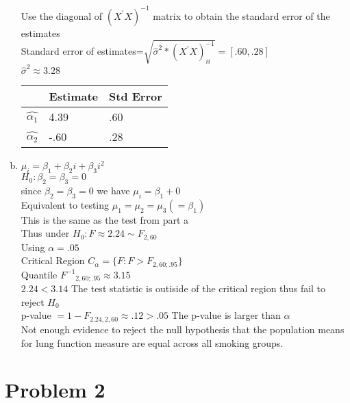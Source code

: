 \documentclass{article}
\begin{document}
\begin{flushleft}
\begin{enumerate}[(a)]
Use the diagonal of $(X^{'}X)^{-1}$ matrix to obtain the standard error of the estimates\\

Standard error of estimates=$\sqrt{\hat{\sigma}^2*(X^{'}X)^{-1}_{ii}}=[.60,.28]$\\

$\hat{\sigma}^2\approx 3.28$\\

\begin{tabular}{l l l}
	\hline
	& Estimate & Std Error\\
	\hline
	$\hat{\alpha_1}$ & 4.39 & .60 \\
	$\hat{\alpha_2}$ & -.60 & .28 \\
	\hline
\end{tabular}

\item
$\mu_i=\beta_1+\beta_2i+\beta_3i^2$\\

$H_0:\beta_2=\beta_3=0$\\

since $\beta_2=\beta_3=0$ we have $\mu_i=\beta_1+ 0$\\

Equivalent to testing $\mu_1=\mu_2=\mu_3 (=\beta_1)$\\

This is the same as the test from part a\\

Thus under $H_0: F \approx 2.24\sim F_{2,60}$\\

Using $\alpha=.05$\\

Critical Region $C_{\alpha}=\{F:F>F_{2,60;.95}\}$\\

Quantile ${F^{-1}}_{2,60;.95} \approx 3.15$\\

$2.24<3.14$ The test statistic is outiside of the critical region thus fail to reject $H_0$\\

p-value $= 1-F_{2.24,2,60}\approx .12>.05$ The p-value is larger than $\alpha$\\

Not enough evidence to reject the null hypothesis that the population means for lung function measure are equal across all smoking groups.
\end{enumerate}


\section*{Problem 2}
	

\end{flushleft}
\end{document}
